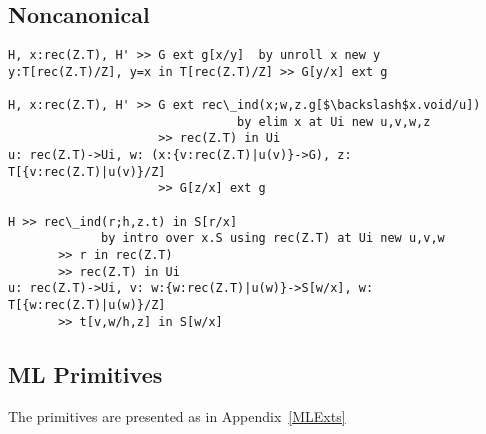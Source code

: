 \subsection*{Noncanonical}

\begin{verbatim}
H, x:rec(Z.T), H' >> G ext g[x/y]  by unroll x new y
y:T[rec(Z.T)/Z], y=x in T[rec(Z.T)/Z] >> G[y/x] ext g
                                                                             
H, x:rec(Z.T), H' >> G ext rec\_ind(x;w,z.g[$\backslash$x.void/u]) 
                                by elim x at Ui new u,v,w,z
                     >> rec(Z.T) in Ui
u: rec(Z.T)->Ui, w: (x:{v:rec(Z.T)|u(v)}->G), z: T[{v:rec(Z.T)|u(v)}/Z] 
                     >> G[z/x] ext g 

H >> rec\_ind(r;h,z.t) in S[r/x] 
             by intro over x.S using rec(Z.T) at Ui new u,v,w
       >> r in rec(Z.T)
       >> rec(Z.T) in Ui
u: rec(Z.T)->Ui, v: w:{w:rec(Z.T)|u(w)}->S[w/x], w: T[{w:rec(Z.T)|u(w)}/Z] 
       >> t[v,w/h,z] in S[w/x]
\end{verbatim}


\subsection*{ML Primitives}

The primitives are presented as in Appendix~\ref{MLExts}




















